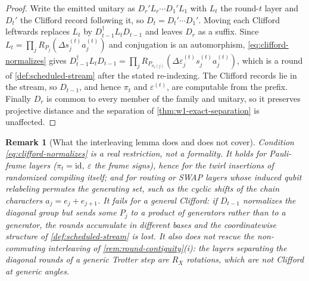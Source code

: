 \documentclass[a4paper,twocolumn,10pt,unpublished]{quantumarticle}
\newtheorem{remark}{Remark}
\begin{document}
\begin{proof}
Write the emitted unitary as $D_r'L_r\cdots D_1'L_1$ with $L_t$ the
round-$t$ layer and $D_t'$ the Clifford record following it, so
$D_t=D_t'\cdots D_1'$.  Moving each Clifford leftwards replaces $L_t$ by
$D_{t-1}^\dagger L_tD_{t-1}$ and leaves $D_r$ as a suffix.  Since
$L_t=\prod_jR_{P_j}(\Delta s_j^{(t)}a_j^{(t)})$ and conjugation is an
automorphism, \eqref{eq:clifford-normalizes} gives
$D_{t-1}^\dagger L_tD_{t-1}
=\prod_jR_{P_{\pi_t(j)}}(\Delta\varepsilon_j^{(t)}s_j^{(t)}a_j^{(t)})$,
which is a round of \cref{def:scheduled-stream} after the stated
re-indexing.  The Clifford records lie in the stream, so $D_{t-1}$, and
hence $\pi_t$ and $\varepsilon^{(t)}$, are computable from the prefix.
Finally $D_r$ is common to every member of the family and unitary, so it
preserves projective distance and the separation of
\cref{thm:w1-exact-separation} is unaffected.
\end{proof}

\begin{remark}[What the interleaving lemma does and does not cover]
\label{rem:clifford-scope}
Condition \eqref{eq:clifford-normalizes} is a real restriction, not a
formality.  It holds for Pauli-frame layers ($\pi_t=\mathrm{id}$,
$\varepsilon$ the frame signs), hence for the twirl insertions of
randomized compiling itself; and for routing or SWAP layers
whose induced qubit relabeling permutes the generating set, such as the
cyclic shifts of the chain characters $a_j=e_j+e_{j+1}$.  It fails for a
general Clifford: if $D_{t-1}$ normalizes the diagonal group but sends
some $P_j$ to a product of generators rather than to a generator, the
rounds accumulate in different bases and the coordinatewise structure of
\cref{def:scheduled-stream} is lost.  It also does not rescue the
non-commuting interleaving of \cref{rem:round-contiguity}(i): the
layers separating the diagonal rounds of a generic Trotter step are
$R_X$ rotations, which are not Clifford at generic angles.
\end{remark}
\end{document}
